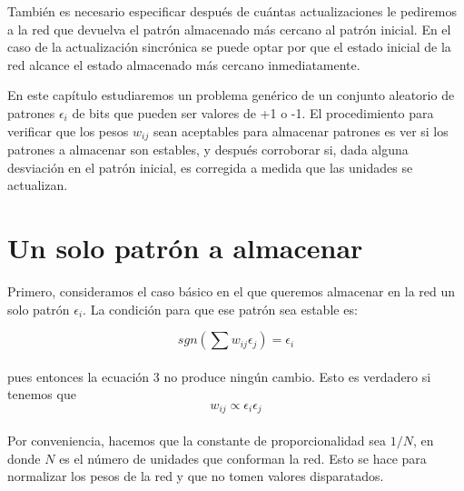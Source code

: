 \documentclass{article}
\begin{document}
También es necesario especificar después de cuántas actualizaciones le pediremos a la red que devuelva el patrón almacenado más cercano al patrón inicial. En el caso de la actualización sincrónica se puede optar por que el estado inicial de la red alcance el estado almacenado más cercano inmediatamente.  

En este capítulo estudiaremos un problema genérico de un conjunto aleatorio de patrones $\epsilon_i$ de bits que pueden ser valores de +1 o -1. El procedimiento para verificar que los pesos $w_{ij}$ sean aceptables para almacenar patrones es ver si los patrones a almacenar son estables, y después corroborar si, dada alguna desviación en el patrón inicial, es corregida a medida que las unidades se actualizan. 

\section{Un solo patrón a almacenar}

Primero, consideramos el caso básico en el que queremos almacenar en la red un solo patrón $\epsilon_i$. La condición para que ese patrón sea estable es:

\begin{equation}
    sgn(\sum w_{ij}\epsilon_j) = \epsilon_i
    \label{eq:patrón estable}
\end{equation}
\\

pues entonces la ecuación 3 no produce ningún cambio. Esto es verdadero si tenemos que
\begin{equation}
    w_{ij} \propto \epsilon_i \epsilon_j
    \label{eq:prpporcionalidad}
\end{equation}
\\

Por conveniencia, hacemos que la constante de proporcionalidad sea $1/N$, en donde $N$ es el número de unidades que conforman la red. Esto se hace para normalizar los pesos de la red y que no tomen valores disparatados.
\end{document}
